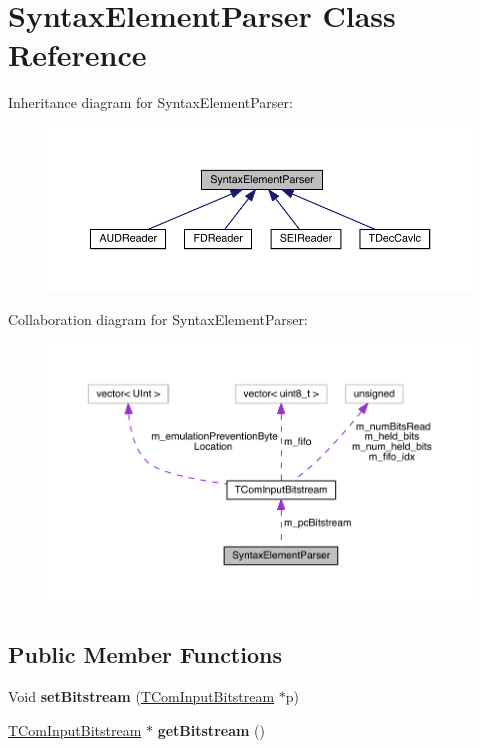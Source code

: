 \hypertarget{class_syntax_element_parser}{}\section{Syntax\+Element\+Parser Class Reference}
\label{class_syntax_element_parser}


Inheritance diagram for Syntax\+Element\+Parser\+:
\nopagebreak
\begin{figure}[H]
\begin{center}
\leavevmode
\includegraphics[width=350pt]{d0/dd6/class_syntax_element_parser__inherit__graph}
\end{center}
\end{figure}


Collaboration diagram for Syntax\+Element\+Parser\+:
\nopagebreak
\begin{figure}[H]
\begin{center}
\leavevmode
\includegraphics[width=350pt]{de/d9a/class_syntax_element_parser__coll__graph}
\end{center}
\end{figure}
\subsection*{Public Member Functions}
\begin{DoxyCompactItemize}
\item 
\mbox{\label{class_syntax_element_parser_a695c4c1cb4b80a8e033a3c9ca876a2e6}} 
Void {\bfseries set\+Bitstream} (\hyperlink{class_t_com_input_bitstream}{T\+Com\+Input\+Bitstream} $\ast$p)
\item 
\mbox{\label{class_syntax_element_parser_a559473fa61b335388be6bdd5459c28f8}} 
\hyperlink{class_t_com_input_bitstream}{T\+Com\+Input\+Bitstream} $\ast$ {\bfseries get\+Bitstream} ()
\end{DoxyCompactItemize}
